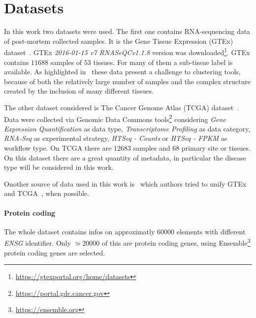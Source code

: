 \section{Datasets}
In this work two datasets were used. The first one contains RNA-sequencing data of post-mortem collected samples. It is the Gene Tissue Expression (GTEx) dataset~\cite{carithers2015novel}. GTEx \textit{2016-01-15 v7 RNASeQCv1.1.8} version was downloaded\footnote{\url{https://gtexportal.org/home/datasets}}.
GTEx contains $11688$ samples of $53$ tissues. For many of them a sub-tissue label is available. As highlighted in~\cite{dey2017visualizing} these data present a challenge to clustering tools, because of both the relatively large number of samples and the complex structure created by the inclusion of many different tissues.

The other dataset considered is The Cancer Genome Atlas (TCGA) dataset~\cite{grossman2016toward}. Data were collected via Genomic Data Commons tools\footnote{\url{https://portal.gdc.cancer.gov}} considering \textit{Gene Expression Quantification} as data type, \textit{Transcriptome Profiling} as data category, \textit{RNA-Seq} as experimental strategy, \textit{HTSeq - Counts} or \textit{HTSeq - FPKM} as workflow type. On TCGA there are $12683$ samples and $68$ primary site or tissues. On this dataset there are a great quantity of metadata, in particular the disease type will be considered in this work.

Onother source of data used in this work is~\cite{Wang2017} which authors tried to unify GTEx and TCGA~\cite{Betel2018}, when possible.

\paragraph{Protein coding}
The whole dataset contains infos on approximatly $60000$ elements with different 
\textit{ENSG} identifier. Only $\simeq 20000$ of this are protein coding genes, 
using Ensemble\footnote{\url{https://ensemble.org}} protein coding genes are 
selected.